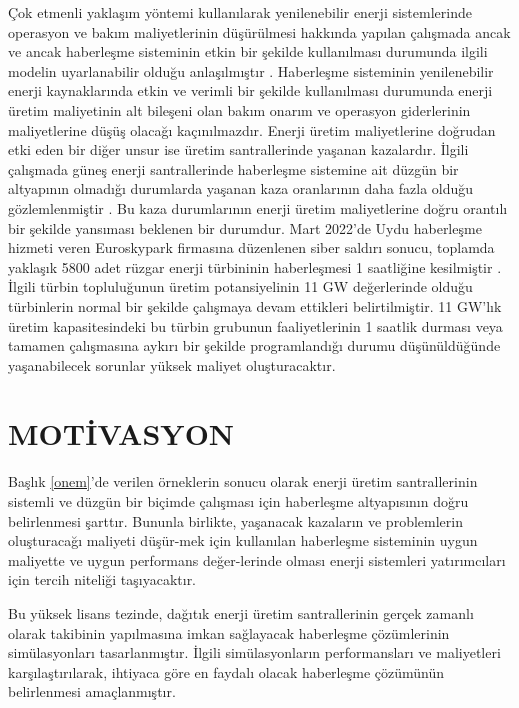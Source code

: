 Çok etmenli yaklaşım yöntemi kullanılarak yenilenebilir enerji sistemlerinde operasyon ve bakım maliyetlerinin düşürülmesi hakkında yapılan çalışmada ancak ve ancak haberleşme sisteminin etkin bir şekilde kullanılması durumunda ilgili modelin uyarlanabilir olduğu anlaşılmıştır \cite{7804974}. 
Haberleşme sisteminin yenilenebilir enerji kaynaklarında etkin ve verimli bir şekilde kullanılması durumunda enerji üretim maliyetinin alt bileşeni olan bakım onarım ve operasyon giderlerinin maliyetlerine düşüş olacağı kaçınılmazdır.
Enerji üretim maliyetlerine doğrudan etki eden bir diğer unsur ise üretim santrallerinde yaşanan kazalardır. İlgili çalışmada güneş enerji santrallerinde haberleşme sistemine ait düzgün bir altyapının olmadığı durumlarda yaşanan kaza oranlarının daha fazla olduğu gözlemlenmiştir \cite{https://doi.org/10.1002/dac.4517}. Bu kaza durumlarının enerji üretim maliyetlerine doğru orantılı bir şekilde yansıması beklenen bir durumdur.
Mart 2022'de Uydu haberleşme hizmeti veren Euroskypark firmasına düzenlenen siber saldırı sonucu, toplamda yaklaşık 5800 adet rüzgar enerji türbininin haberleşmesi 1 saatliğine kesilmiştir \cite{sibersaldiri}. İlgili türbin topluluğunun üretim potansiyelinin 11 GW değerlerinde olduğu türbinlerin normal bir şekilde çalışmaya devam ettikleri belirtilmiştir. 11 GW'lık üretim kapasitesindeki bu türbin grubunun faaliyetlerinin 1 saatlik durması veya tamamen çalışmasına aykırı bir şekilde programlandığı durumu düşünüldüğünde yaşanabilecek sorunlar yüksek maliyet oluşturacaktır.




\section{MOTİVASYON} \label{motivasyon}



Başlık \ref{onem}'de verilen örneklerin sonucu olarak enerji üretim santrallerinin sistemli ve düzgün bir biçimde çalışması için haberleşme altyapısının doğru belirlenmesi şarttır. Bununla birlikte, yaşanacak kazaların ve problemlerin oluşturacağı maliyeti düşür-mek için kullanılan haberleşme sisteminin uygun maliyette ve uygun performans değer-lerinde olması enerji sistemleri yatırımcıları için tercih niteliği taşıyacaktır.

Bu yüksek lisans tezinde, dağıtık enerji üretim santrallerinin gerçek zamanlı olarak takibinin yapılmasına imkan sağlayacak haberleşme çözümlerinin simülasyonları tasarlanmıştır. İlgili simülasyonların performansları ve maliyetleri karşılaştırılarak, ihtiyaca göre en faydalı olacak haberleşme çözümünün belirlenmesi amaçlanmıştır.


